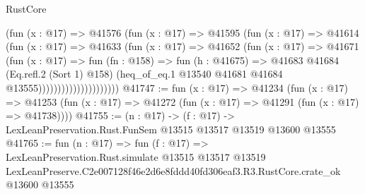 \begin{lexlean}{RustCore}
\begin{coremodule}
                              (fun (x : @17) =>
                              @41576
                                (fun (x : @17) =>
                                @41595
                                  (fun (x : @17) =>
                                  @41614
                                    (fun (x : @17) =>
                                    @41633
                                      (fun (x : @17) =>
                                      @41652
                                        (fun (x : @17) =>
                                        @41671
                                          (fun (x : @17) =>
                                          fun (fn : @158) =>
                                          fun (h : @41675) =>
                                          @41683
                                            @41684
                                            (Eq.refl.{2} (Sort 1) @158)
                                            (heq_of_eq.{1}
                                              @13540
                                              @41681
                                              @41684
                                              @13555)))))))))))))))))))))
@41747 := fun (x : @17) =>
  @41234
    (fun (x : @17) =>
    @41253 (fun (x : @17) => @41272 (fun (x : @17) => @41291 (fun (x : @17) => @41738))))
@41755 := (n : @17) ->
  (f : @17) -> LexLeanPreservation.Rust.FunSem @13515 @13517 @13519 @13600 @13555
@41765 := fun (n : @17) =>
  fun (f : @17) =>
  LexLeanPreservation.Rust.simulate
    @13515
    @13517
    @13519
    LexLeanPreserve.C2e007128f46e2d6e8fddd40fd306eaf3.R3.RustCore.crate_ok
    @13600
    @13555
\end{coremodule}
\end{lexlean}
